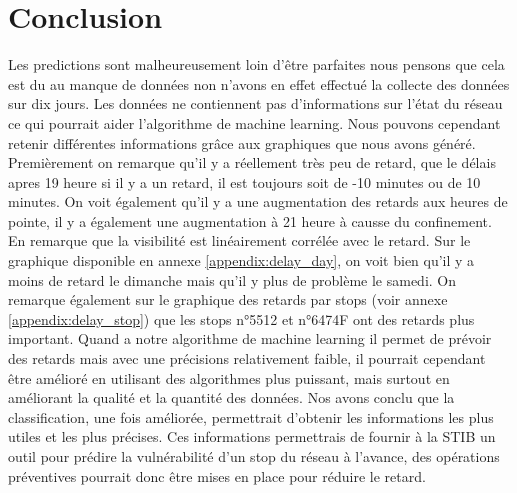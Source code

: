 \chapter{Conclusion}

Les predictions sont malheureusement loin d'être parfaites nous pensons que cela est du au manque de données non n'avons en effet effectué la collecte des données sur dix jours. Les données ne contiennent pas d'informations sur l'état du réseau ce qui pourrait aider l'algorithme de machine learning. Nous pouvons cependant retenir différentes informations grâce aux graphiques que nous avons généré. Premièrement on remarque qu'il y a réellement très peu de retard, que le délais apres 19 heure si il y a un retard, il est toujours soit de -10 minutes ou de 10 minutes. On voit également qu'il y a une augmentation des retards aux heures de pointe, il y a également une augmentation à 21 heure à causse du confinement. En remarque que la visibilité est linéairement corrélée avec le retard. Sur le graphique disponible en annexe \ref{appendix:delay_day}, on voit bien qu'il y a moins de retard le dimanche mais qu'il y plus de problème le samedi. On remarque également sur le graphique des retards par stops (voir annexe \ref{appendix:delay_stop}) que les stops n°5512 et n°6474F ont des retards plus important. Quand a notre algorithme de machine learning il permet de prévoir des retards mais avec une précisions relativement faible, il pourrait cependant être amélioré en utilisant des algorithmes plus puissant, mais surtout en améliorant la qualité et la quantité des données. Nos avons conclu que la classification, une fois améliorée, permettrait d'obtenir les informations les plus utiles et les plus précises. Ces informations permettrais de fournir à la STIB un outil pour prédire la vulnérabilité d'un stop du réseau à l'avance, des opérations préventives pourrait donc être mises en place pour réduire le retard.
